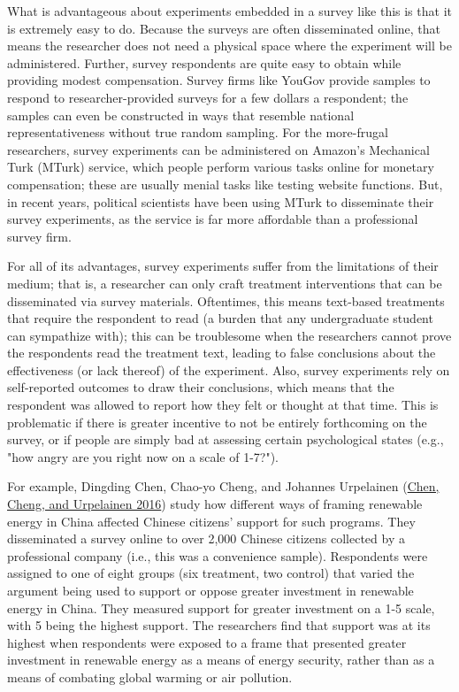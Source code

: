 \documentclass{book}
\begin{document}
What is advantageous about experiments embedded in a survey like this is that
it is extremely easy to do. Because the surveys are often disseminated online,
that means the researcher does not need a physical space where the experiment
will be administered. Further, survey respondents are quite easy to obtain
while providing modest compensation. Survey firms like YouGov provide samples
to respond to researcher-provided surveys for a few dollars a respondent; the
samples can even be constructed in ways that resemble national
representativeness without true random sampling. For the more-frugal
researchers, survey experiments can be administered on Amazon's Mechanical
Turk (MTurk) service, which people perform various tasks online for monetary
compensation; these are usually menial tasks like testing website functions.
But, in recent years, political scientists have been using MTurk to
disseminate their survey experiments, as the service is far more affordable
than a professional survey firm.

For all of its advantages, survey experiments suffer from the limitations of
their medium; that is, a researcher can only craft treatment interventions
that can be disseminated via survey materials. Oftentimes, this means
text-based treatments that require the respondent to read (a burden that any
undergraduate student can sympathize with); this can be troublesome when the
researchers cannot prove the respondents read the treatment text, leading to
false conclusions about the effectiveness (or lack thereof) of the experiment.
Also, survey experiments rely on self-reported outcomes to draw their
conclusions, which means that the respondent was allowed to report how they
felt or thought at that time. This is problematic if there is greater
incentive to not be entirely forthcoming on the survey, or if people are
simply bad at assessing certain psychological states (e.g., "how angry are you
right now on a scale of 1-7?").

For example, Dingding Chen, Chao-yo Cheng, and Johannes Urpelainen
(\protect\hyperlink{ref-chen_support_2016}{Chen, Cheng, and Urpelainen 2016})
study how different ways of framing renewable energy in China affected Chinese
citizens' support for such programs. They disseminated a survey online to over
2,000 Chinese citizens collected by a professional company (i.e., this was a
convenience sample). Respondents were assigned to one of eight groups (six
treatment, two control) that varied the argument being used to support or
oppose greater investment in renewable energy in China. They measured support
for greater investment on a 1-5 scale, with 5 being the highest support. The
researchers find that support was at its highest when respondents were exposed
to a frame that presented greater investment in renewable energy as a means of
energy security, rather than as a means of combating global warming or air
pollution.
\end{document}
